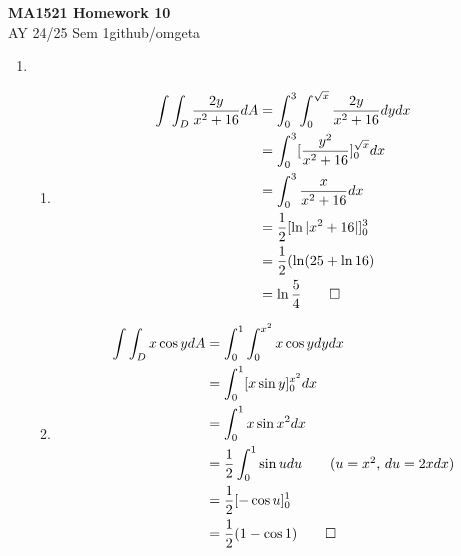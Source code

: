 \documentclass[12pt, a4paper]{article}
\newcommand{\mytitle}{MA1521 Homework 10}
\newcommand{\myauthor}{github/omgeta}
\newcommand{\mydate}{AY 24/25 Sem 1}
\begin{document}
\raggedright
\footnotesize
\begin{center}
{\normalsize{\textbf{\mytitle}}} \\
{\footnotesize{\mydate\hspace{2pt}\textemdash\hspace{2pt}\myauthor}}
\end{center}

\begin{enumerate}[Q\arabic*.]
  \item 
    \begin{enumerate}[(\alph*)]
      \item 
        \begin{align*}
          \int\int_D \frac{2y}{x^2+16}dA &= \int^3_0\int^{\sqrt{x}}_0 \frac{2y}{x^2+16} dydx\\
                                         &= \int^3_0 [\frac{y^2}{x^2+16}]^{\sqrt{x}}_0 dx\\
                                         &= \int^3_0 \frac{x}{x^2+16} dx\\
                                         &= \frac{1}{2}[\ln |x^2+16|]^3_0\\
                                         &= \frac{1}{2}(\ln (25 + \ln 16)\\
                                         &= \ln \frac{5}{4} \qed
        \end{align*}

      \item 
        \begin{align*}
          \int\int_D x\cos y dA &= \int^1_0 \int^{x^2}_0 x\cos y dydx\\
                                &= \int^1_0 [x\sin y]^{x^2}_0 dx\\
                                &= \int^1_0 x\sin x^2 dx\\
                                &= \frac{1}{2} \int^1_0 \sin u du\tag*{($u=x^2$, $du=2xdx$)}\\
                                &= \frac{1}{2}[-\cos u]^1_0\\
                                &= \frac{1}{2}(1-\cos 1)\qed 
        \end{align*}
    \end{enumerate}
    \pagebreak


\end{enumerate}
\end{document}
